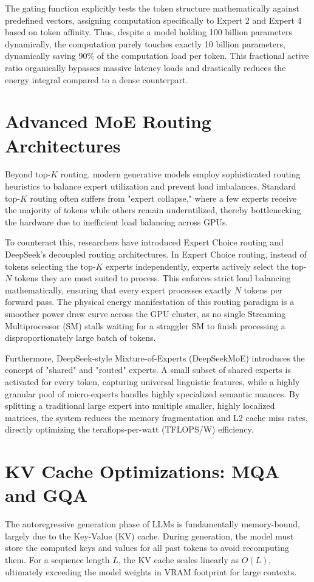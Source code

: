 \documentclass[12pt, a4paper]{report}
\begin{document}
The gating function explicitly tests the token structure mathematically against predefined vectors, assigning computation specifically to Expert 2 and Expert 4 based on token affinity. Thus, despite a model holding 100 billion parameters dynamically, the computation purely touches exactly 10 billion parameters, dynamically saving 90\% of the computation load per token. This fractional active ratio organically bypasses massive latency loads and drastically reduces the energy integral compared to a dense counterpart.

\section{Advanced MoE Routing Architectures}
Beyond top-$K$ routing, modern generative models employ sophisticated routing heuristics to balance expert utilization and prevent load imbalances. Standard top-$K$ routing often suffers from "expert collapse," where a few experts receive the majority of tokens while others remain underutilized, thereby bottlenecking the hardware due to inefficient load balancing across GPUs. 

To counteract this, researchers have introduced Expert Choice routing and DeepSeek's decoupled routing architectures. In Expert Choice routing, instead of tokens selecting the top-$K$ experts independently, experts actively select the top-$N$ tokens they are most suited to process. This enforces strict load balancing mathematically, ensuring that every expert processes exactly $N$ tokens per forward pass. The physical energy manifestation of this routing paradigm is a smoother power draw curve across the GPU cluster, as no single Streaming Multiprocessor (SM) stalls waiting for a straggler SM to finish processing a disproportionately large batch of tokens.

Furthermore, DeepSeek-style Mixture-of-Experts (DeepSeekMoE) introduces the concept of "shared" and "routed" experts. A small subset of shared experts is activated for every token, capturing universal linguistic features, while a highly granular pool of micro-experts handles highly specialized semantic nuances. By splitting a traditional large expert into multiple smaller, highly localized matrices, the system reduces the memory fragmentation and L2 cache miss rates, directly optimizing the teraflops-per-watt (TFLOPS/W) efficiency.

\section{KV Cache Optimizations: MQA and GQA}
The autoregressive generation phase of LLMs is fundamentally memory-bound, largely due to the Key-Value (KV) cache. During generation, the model must store the computed keys and values for all past tokens to avoid recomputing them. For a sequence length $L$, the KV cache scales linearly as $O(L)$, ultimately exceeding the model weights in VRAM footprint for large contexts.
\end{document}
